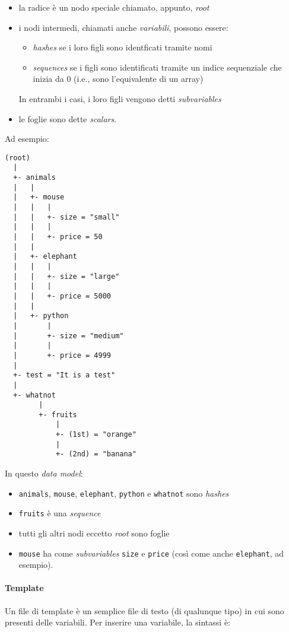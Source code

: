 \begin{itemize}
\item la radice è un nodo speciale chiamato, appunto, \textit{root}
\item i nodi intermedi, chiamati anche \textsl{variabili}, possono essere:
\begin{itemize}
\item \textit{hashes} se i loro figli sono identficati tramite nomi
\item \textit{sequences} se i figli sono identificati tramite un indice sequenziale che inizia da 0 (i.e., sono l'equivalente di un array)
\end{itemize}
In entrambi i casi, i loro figli vengono detti \textit{subvariables}
\item le foglie sono dette \textit{scalars}.
\end{itemize}

Ad esempio:

\begin{lstlisting}
(root)
  |
  +- animals
  |   |
  |   +- mouse
  |   |   |   
  |   |   +- size = "small"
  |   |   |   
  |   |   +- price = 50
  |   |
  |   +- elephant
  |   |   |   
  |   |   +- size = "large"
  |   |   |   
  |   |   +- price = 5000
  |   |
  |   +- python
  |       |   
  |       +- size = "medium"
  |       |   
  |       +- price = 4999
  |
  +- test = "It is a test"
  |
  +- whatnot
        |
        +- fruits
            |
            +- (1st) = "orange"
            |
            +- (2nd) = "banana"
\end{lstlisting}

In questo \textit{data model}:

\begin{itemize}
\item \lstinline{animals}, \lstinline{mouse}, \lstinline{elephant}, \lstinline{python} e \lstinline{whatnot} sono \textit{hashes}
\item \lstinline{fruits} è una \textit{sequence}
\item tutti gli altri nodi eccetto \textit{root} sono foglie
\item \lstinline{mouse} ha come \textit{subvariables} \lstinline{size} e \lstinline{price} (così come anche \lstinline{elephant}, ad esempio).
\end{itemize}


\paragraph{Template} 
Un file di template è un semplice file di testo (di qualunque tipo) in cui sono presenti delle variabili. Per inserire una variabile, la sintassi è:

